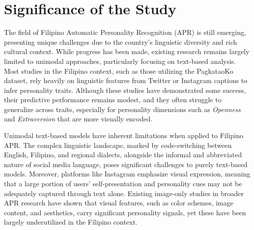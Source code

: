 


\section{Significance of the Study}
\label{sec: Significance}

The field of Filipino Automatic Personality Recognition (APR) is still emerging, presenting unique challenges due to the country’s linguistic diversity and rich cultural context. While progress has been made, existing research remains largely limited to unimodal approaches, particularly focusing on text-based analysis. Most studies in the Filipino context, such as those utilizing the PagkataoKo dataset, rely heavily on linguistic features from Twitter or Instagram captions to infer personality traits. Although these studies have demonstrated some success, their predictive performance remains modest, and they often struggle to generalize across traits, especially for personality dimensions such as \textit{Openness} and \textit{Extraversion} that are more visually encoded.

Unimodal text-based models have inherent limitations when applied to Filipino APR. The complex linguistic landscape, marked by code-switching between English, Filipino, and regional dialects, alongside the informal and abbreviated nature of social media language, poses significant challenges to purely text-based models. Moreover, platforms like Instagram emphasize visual expression, meaning that a large portion of users' self-presentation and personality cues may not be adequately captured through text alone. Existing image-only studies in broader APR research have shown that visual features, such as color schemes, image content, and aesthetics, carry significant personality signals, yet these have been largely underutilized in the Filipino context.

